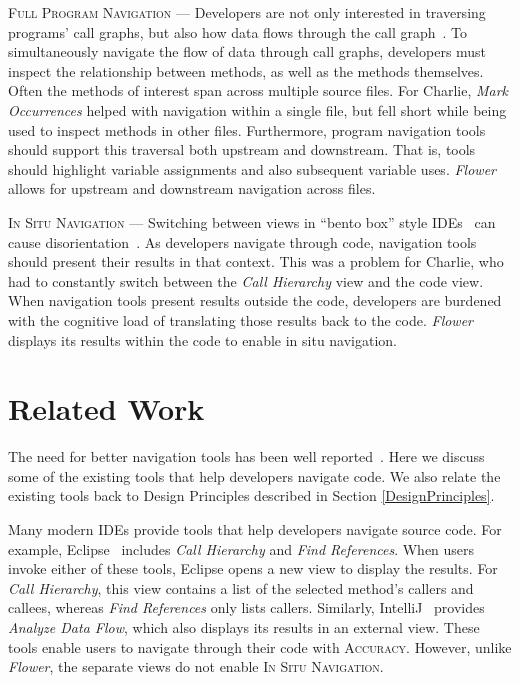\documentclass[conference]{IEEEtran}
\begin{document}
\vspace{1em} 
\noindent\textsc{Full Program Navigation}  ---
Developers are not only interested in traversing programs' call graphs, but also how data flows through the call graph~\cite{Smith2015}.
To simultaneously navigate the flow of data through call graphs, developers must inspect the relationship between methods, as well as the methods themselves.
Often the methods of interest span across multiple source files.
For Charlie, \emph{Mark Occurrences} helped with navigation within a single file, but fell short while being used to inspect methods in other files.
Furthermore, program navigation tools should support this traversal both upstream and downstream. 
That is, tools should highlight variable assignments and also subsequent variable uses. 
\textit{Flower} allows for upstream and downstream navigation across files.

\vspace{1em} 
\noindent\textsc{In Situ Navigation}  ---
Switching between views in ``bento box'' style IDEs~\cite{DeLine:2010:bento} can cause disorientation~\cite{deAlwis2006disorient}.
As developers navigate through code, navigation tools should present their results in that context. 
This was a problem for Charlie, who had to constantly switch between the \emph{Call Hierarchy} view and the code view.
When navigation tools present results outside the code, developers are burdened with the cognitive load of translating those results back to the code.
\textit{Flower} displays its results within the code to enable in situ navigation.

\section{Related Work}
The need for better navigation tools has been well reported~\cite{ko2006seekInfo}.
Here we discuss some of the existing tools that help developers navigate code. 
We also relate the existing tools back to Design Principles described in Section \ref{DesignPrinciples}.

Many modern IDEs provide tools that help developers navigate source code. 
For example, Eclipse~\cite{Eclipse} includes \emph{Call Hierarchy} and \emph{Find References}. 
When users invoke either of these tools, Eclipse opens a new view to display the results.
For \emph{Call Hierarchy}, this view contains a list of the selected method's callers and callees, whereas \emph{Find References} only lists callers.
Similarly, IntelliJ~\cite{IntelliJ} provides \emph{Analyze Data Flow}, which also displays its results in an external view.
These tools enable users to navigate through their code with \textsc{Accuracy}. 
However, unlike \textit{Flower}, the separate views do not enable \textsc{In Situ Navigation}. %
\end{document}
